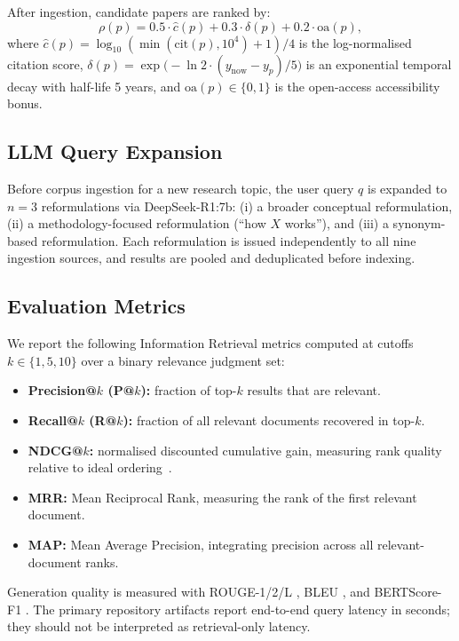 \documentclass[conference,10pt,twocolumn]{IEEEtran}
\begin{document}
After ingestion, candidate papers are ranked by:
\begin{equation}
  \rho(p) = 0.5\cdot\hat{c}(p) + 0.3\cdot\delta(p) + 0.2\cdot\mathrm{oa}(p),
  \label{eq:composite}
\end{equation}
where $\hat{c}(p) = \log_{10}(\min(\mathrm{cit}(p),10^4)+1)/4$ is the log-normalised citation score, $\delta(p) = \exp\!\bigl(-\ln 2 \cdot (y_{\mathrm{now}}-y_p)/5\bigr)$ is an exponential temporal decay with half-life 5 years, and $\mathrm{oa}(p)\in\{0,1\}$ is the open-access accessibility bonus.

\subsection{LLM Query Expansion}

Before corpus ingestion for a new research topic, the user query $q$ is expanded to $n=3$ reformulations via DeepSeek-R1:7b: (i) a broader conceptual reformulation, (ii) a methodology-focused reformulation (``how $X$ works''), and (iii) a synonym-based reformulation. Each reformulation is issued independently to all nine ingestion sources, and results are pooled and deduplicated before indexing.

\subsection{Evaluation Metrics}

We report the following Information Retrieval metrics computed at cutoffs $k\in\{1,5,10\}$ over a binary relevance judgment set:
\begin{itemize}
  \item \textbf{Precision@$k$ (P@$k$):} fraction of top-$k$ results that are relevant.
  \item \textbf{Recall@$k$ (R@$k$):} fraction of all relevant documents recovered in top-$k$.
  \item \textbf{NDCG@$k$:} normalised discounted cumulative gain, measuring rank quality relative to ideal ordering~\cite{jarvelin2002cumulated}.
  \item \textbf{MRR:} Mean Reciprocal Rank, measuring the rank of the first relevant document.
  \item \textbf{MAP:} Mean Average Precision, integrating precision across all relevant-document ranks.
\end{itemize}
Generation quality is measured with ROUGE-1/2/L \cite{lin2004rouge}, BLEU \cite{papineni2002bleu}, and BERTScore-F1 \cite{zhang2020bertscore}. The primary repository artifacts report end-to-end query latency in seconds; they should not be interpreted as retrieval-only latency.
\end{document}
